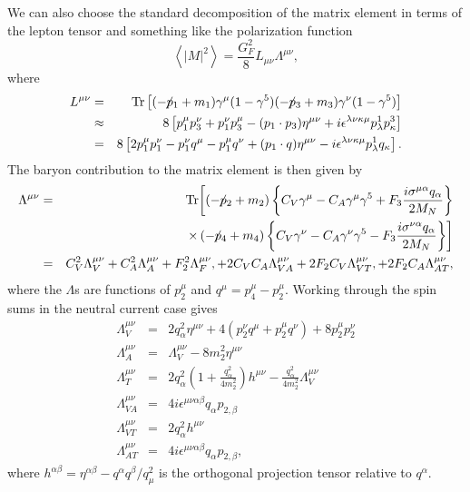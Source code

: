 \documentclass[12pt,letter]{article}
\newcommand{\fsl}[1]{\ensuremath{\mathrlap{\!\not{\phantom{#1}}}#1}}
\begin{document}
We can also choose the standard decomposition of the matrix element in terms of the lepton tensor and something like the polarization function 
\begin{equation*}
\left\langle \left| M \right|^2 \right \rangle = \frac{G_F^2}{8}
L_{\mu \nu} \Lambda^{\mu \nu},
\end{equation*}
where 
\begin{eqnarray*}
L^{\mu \nu} &=& \textrm{Tr}\left[
(-\fsl{p}_1 + m_1) \gamma^\mu(1-\gamma^5) 
(-\fsl{p}_3 + m_3) \gamma^\nu(1-\gamma^5)  
\right] \\
&\approx& 8 \left[p_1^\mu p_3^\nu + p_1^\nu p_3^\mu 
- (p_1 \cdot p_3) \eta^{\mu \nu}   
+ i \epsilon^{\lambda \nu \kappa \mu} p_\lambda^1 p_\kappa^3
\right] \\
&=& 8 \left[2p_1^\mu p_1^\nu - p_1^\nu q^\mu - p_1^\mu q^\nu 
+ (p_1 \cdot q) \eta^{\mu \nu}   
- i \epsilon^{\lambda \nu \kappa \mu} p_\lambda^1 q_\kappa
\right].
\end{eqnarray*}
The baryon contribution to the matrix 
element is then given by 
\begin{eqnarray*}
\Lambda^{\mu \nu} &=& \textrm{Tr}\biggl[
(-\fsl{p}_2 + m_2) 
\left\{ C_V\gamma^\mu -C_A\gamma^\mu \gamma^5 
+ F_3\frac{i \sigma^{\mu \alpha}q_\alpha}{2 M_N} \right\}
\nonumber\\
&& \times \, (-\fsl{p}_4 + m_4)
\left \{ C_V\gamma^\nu -C_A\gamma^\nu \gamma^5 
- F_3\frac{i \sigma^{\nu \alpha}q_\alpha}{2 M_N} \right\}
\biggr] \\
&=& C_V^2 \Lambda^{\mu \nu}_V 
+ C_A^2 \Lambda^{\mu \nu}_A 
+ F_2^2 \Lambda^{\mu \nu}_F,
+ 2 C_V C_A \Lambda^{\mu \nu}_{VA} 
+ 2 F_2 C_V \Lambda^{\mu \nu}_{VT}, 
+ 2 F_2 C_A \Lambda^{\mu \nu}_{AT},
\end{eqnarray*}
where the $\Lambda$s are functions of $p_2^\mu$ and $q^\mu = p_4^\mu - p_2^\mu$.
Working through the spin sums in the neutral current case gives
\begin{eqnarray}
\Lambda^{\mu\nu}_V &=& 2 q_\alpha^2 \eta^{\mu \nu} 
+ 4(p_2^\nu q^\mu + p_2^\mu q^\nu) + 8 p_2^\mu p_2^\nu \\
\Lambda^{\mu\nu}_A &=& \Lambda^{\mu\nu}_V - 8 m_2^2 \eta^{\mu \nu} \\
\Lambda^{\mu\nu}_T &=& 2 q_\alpha^2 
\left(1 + \frac{q_\alpha^2}{4 m_2^2} \right)h^{\mu \nu}
-\frac{q_\alpha^2}{4 m_2^2} \Lambda^{\mu \nu}_V \\
\Lambda^{\mu\nu}_{VA} &=& 4 i \epsilon^{\mu \nu \alpha \beta}q_\alpha p_{2,\beta} 
\\
\Lambda^{\mu\nu}_{VT} &=& 2q_\alpha^2 h^{\mu \nu}
\\
\Lambda^{\mu\nu}_{AT} &=& 4 i \epsilon^{\mu \nu \alpha \beta}q_\alpha p_{2,\beta} , 
\end{eqnarray}
where $h^{\alpha \beta} = \eta^{\alpha \beta} - q^\alpha q^\beta/q_\mu^2$ is the
orthogonal projection tensor relative to $q^\alpha$.
\end{document}
